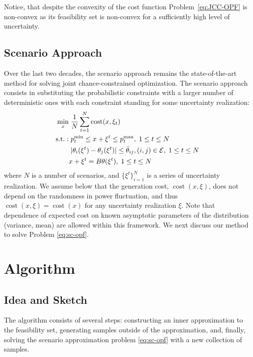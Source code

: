 \documentclass{IEEEtran4PSCC}
\DeclareMathOperator*{\cost}{cost}
\DeclareMathOperator*{\st}{s.t.:}
\newcommand{\cE}{{\cal E}}
\begin{document}
Notice, that despite the convexity of the cost function Problem~\eqref{eq:JCC-OPF} is non-convex as its feasibility set is non-convex for a sufficiently high level of uncertainty. 

\subsection{Scenario Approach}

Over the last two decades, the scenario approach \cite{nemirovski2006scenario,calafiore2006scenario} 
remains the state-of-the-art method for solving joint chance-constrained optimization. The scenario approach consists in substituting the probabilistic constraints with a larger number of deterministic ones with each constraint standing for some uncertainty realization:
\begin{align}\label{eq:sc-opf}
  \min_x & \; \frac{1}{N} \sum_{t=1}^N \cost(x,\xi_t)\\
  \st & \; p_t^{\min} \le x+\xi^t \le p_t^{\max}, \; 1\le t \le N\nonumber\\
  & \; |\theta_i(\xi^t) - \theta_j(\xi^t)| \le {\bar \theta}_{ij}, (i, j)\in \cE, \; 1\le t \le N\nonumber\\
  & x+\xi^t = B \theta(\xi^t), \; 1\le t \le N\nonumber
\end{align}
where $N$ is a number of scenarios, and $\{\xi^t\}_{i=1}^N$ is a series of uncertainty realization. We assume below that the generation cost, $\cost(x, \xi)$, does not depend on the randomness in power fluctuation, and thus $\cost(x, \xi) = \cost(x)$ for any uncertainty realization $\xi$. Note that dependence of expected cost on known asymptotic parameters of the distribution (variance, mean) are allowed within this framework. We next discuss our method to solve Problem \eqref{eq:sc-opf}.

\section{Algorithm}\label{sec:algo}

\subsection{Idea and Sketch}
The algorithm consists of several steps: constructing an inner approximation to the feasibility set, generating samples outside of the approximation, and, finally, solving the scenario approximation problem \eqref{eq:sc-opf} with a new collection of samples. 
\end{document}
